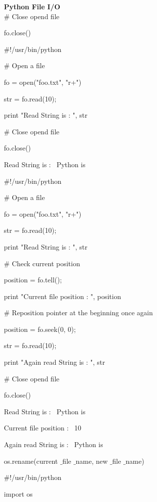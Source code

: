 \begin{center}{\fontsize{24pt}{24pt}\selectfont \textbf{Python File I/O} \\}
 $  \#  $ Close opend file 
 
fo.close() 

 $  \#  $!/usr/bin/python 
\vspace{12pt}

 $  \#  $ Open a file 
 
fo = open("foo.txt", "r+") 

str = fo.read(10); 

print "Read String is : ", str 
\vspace{12pt}

 $  \#  $ Close opend file
 
fo.close() 
\vspace{12pt}
 
Read String is :~ Python is 
\vspace{16pt}
 
 $  \#  $!/usr/bin/python 
\vspace{12pt}

 $  \#  $ Open a file 
 
fo = open("foo.txt", "r+") 

str = fo.read(10); 

print "Read String is : ", str 
\vspace{12pt}
 
 $  \#  $ Check current position 
 
position = fo.tell(); 

print "Current file position : ", position 
\vspace{12pt}

 $  \#  $ Reposition pointer at the beginning once again 
 
position = fo.seek(0, 0); 

str = fo.read(10); 

print "Again read String is : ", str 

 $  \#  $ Close opend file 
 
fo.close() 
\vspace{14pt}

Read String is :~ Python is 

Current file position :~ 10 

Again read String is :~ Python is 
\vspace{14pt}

os.rename(current $  \_  $file $  \_  $name, new $  \_  $file $  \_  $name) 
\vspace{14pt}

 $  \#  $!/usr/bin/python 
 
import os 
\vspace{12pt}


\end{center}
